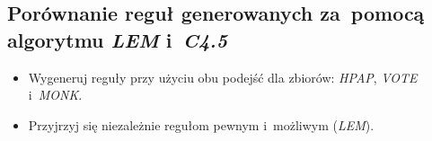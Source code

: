 \documentclass{article}
\begin{document}
\subsection{Porównanie reguł generowanych za~pomocą algorytmu \emph{LEM} i~\emph{C4.5}}

\begin{itemize}
\item Wygeneruj reguły przy użyciu obu podejść dla zbiorów: \emph{HPAP}, \emph{VOTE} i~\emph{MONK}.
\item Przyjrzyj się niezależnie regułom pewnym i~możliwym (\emph{LEM}).
\end{itemize}





\end{document}

